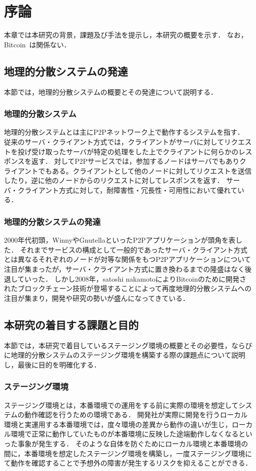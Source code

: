\chapter{序論}
\label{introduction}

本章では本研究の背景，課題及び手法を提示し，本研究の概要を示す．
なお，Bitcoin~\cite{Bitcoin}は関係ない．

\section{地理的分散システムの発達}
本節では，地理的分散システムの概要とその発達について説明する．

\subsection{地理的分散システム}
地理的分散システムとは主にP2Pネットワーク上で動作するシステムを指す．
従来のサーバ・クライアント方式では，クライアントがサーバに対してリクエストを投げ受け取ったサーバが特定の処理をした上でクライアントに何らかのレスポンスを返す．
対してP2Pサービスでは，参加するノードはサーバでもありクライアントでもある。クライアントとして他のノードに対してリクエストを送信したり，逆に他のノードからのリクエストに対してレスポンスを返す．
サーバ・クライアント方式に対して，耐障害性・冗長性・可用性において優れている．

\subsection{地理的分散システムの発達}
2000年代初頭，WinnyやGnutellaといったP2Pアプリケーションが頭角を表した．
それまでサービスの構成として一般的であったサーバ・クライアント方式とは異なるそれぞれのノードが対等な関係をもつP2Pアプリケーションについて注目が集まったが，サーバ・クライアント方式に置き換わるまでの隆盛はなく後退していった．
しかし2008年，satoshi nakamotoによりBitcoinのために開発されたブロックチェーン技術が登場することによって再度地理的分散システムへの注目が集まり，開発や研究の勢いが盛んになってきている．

\section{本研究の着目する課題と目的}
本節では，本研究で着目しているステージング環境の概要とその必要性，ならびに地理的分散システムのステージング環境を構築する際の課題点について説明し，最後に目的を明確化する．

\subsection{ステージング環境}
ステージング環境とは，本番環境での運用をする前に実際の環境を想定してシステムの動作確認を行うための環境である．
開発社が実際に開発を行うローカル環境と実運用する本番環境では，度々環境の差異から動作の違いが生じ，ローカル環境で正常に動作していたものが本番環境に反映した途端動作しなくなるといった事象が発生する．
そのような自体を防ぐためにローカル環境と本番環境の間に，本番環境を想定したステージング環境を構築し，一度ステージング環境にて動作を確認することで予想外の障害が発生するリスクを抑えることができる．


